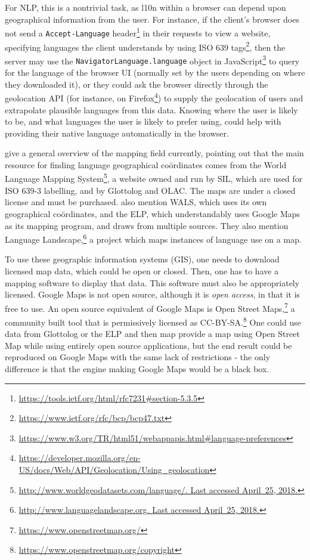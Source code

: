 For NLP, this is a nontrivial task, as l10n within a browser can depend upon geographical information from the user. For instance, if the client's browser does not send a {\tt Accept-Language} header\footnote{\href{https://tools.ietf.org/html/rfc7231\#section-5.3.5}{https://tools.ietf.org/html/rfc7231\#section-5.3.5}} in their requests to view a website, specifying languages the client understands by using ISO 639 tags\footnote{\href{https://www.ietf.org/rfc/bcp/bcp47.txt}{https://www.ietf.org/rfc/bcp/bcp47.txt}}, then the server may use the {\tt NavigatorLanguage.language} object in JavaScript\footnote{\href{https://www.w3.org/TR/html51/webappapis.html\#language-preferences}{https://www.w3.org/TR/html51/webappapis.html\#language-preferences}} to query for the language of the browser UI (normally set by the users depending on where they downloaded it), or they could ask the browser directly through the geolocation API (for instance, on Firefox\footnote{\href{https://developer.mozilla.org/en-US/docs/Web/API/Geolocation/Using\_geolocation}{https://developer.mozilla.org/en-US/docs/Web/API/Geolocation/Using\_geolocation}}) to supply the geolocation of users and extrapolate plausible languages from this data. Knowing where the user is likely to be, and what languages the user is likely to prefer using, could help with providing their native language automatically in the browser.

\citet{gawne2016mapmaking} give a general overview of the mapping field currently, pointing out that the main resource for finding language geographical co\"ordinates comes from the World Language Mapping System\footnote{\href{http://www.worldgeodatasets.com/language/.}{http://www.worldgeodatasets.com/language/. Last accessed April~25, 2018.}}, a website owned and run by SIL, which are used for ISO 639-3 labelling, and by Glottolog and OLAC. The maps are under a closed license and must be purchased. \citet{gawne2016mapmaking} also mention WALS, which uses its own geographical co\"ordinates, and the ELP, which understandably uses Google Maps as its mapping program, and draws from multiple sources. They also mention Language Landscape,\footnote{\href{http://www.languagelandscape.org/}{http://www.languagelandscape.org. Last accessed April~25, 2018.}} a project which maps instances of language use on a map.

To use these geographic information systems (GIS), one needs to download licensed map data, which could be open or closed. Then, one has to have a mapping software to display that data. This software must also be appropriately licensed. Google Maps is not open source, although it is {\it open access}, in that it is free to use. An open source equivalent of Google Maps is Open Street Maps,\footnote{\href{https://www.openstreetmap.org/}{https://www.openstreetmap.org/}} a community built tool that is permissively licensed as CC-BY-SA.\footnote{\href{https://www.openstreetmap.org/copyright}{https://www.openstreetmap.org/copyright}} One could use data from Glottolog or the ELP and then map provide a map using Open Street Map while using entirely open source applications, but the end result could be reproduced on Google Maps with the same lack of restrictions - the only difference is that the engine making Google Maps would be a black box. 

